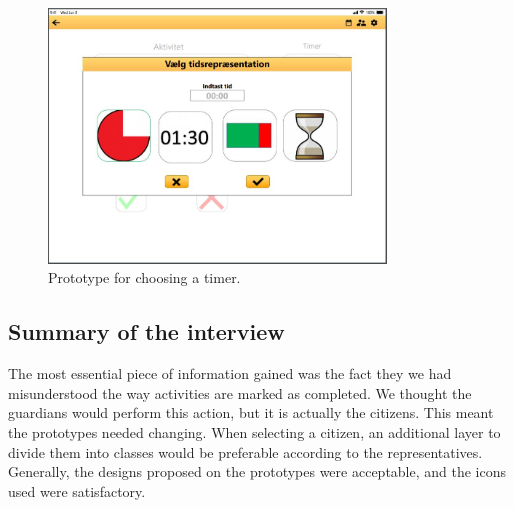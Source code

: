 \begin{figure}[h!]
  \center
  \includegraphics[width=0.8\textwidth]{figures/select-timer-prototype.JPG}
  \caption{\label{fig:choose-timer-prototype} Prototype for choosing a timer.}
\end{figure}

\subsection{Summary of the interview}
The most essential piece of information gained was the fact they we had misunderstood the way activities are marked as completed.
We thought the guardians would perform this action, but it is actually the citizens.
This meant the prototypes needed changing.
When selecting a citizen, an additional layer to divide them into classes would be preferable according to the representatives.
Generally, the designs proposed on the prototypes were acceptable, and the icons used were satisfactory.
